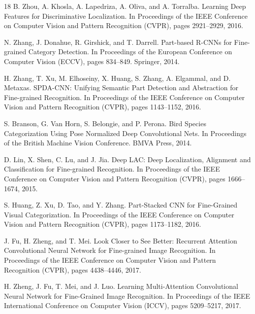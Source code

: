 \documentclass[conference]{IEEEtran}
\begin{document}
\begin{thebibliography}{18}
 B. Zhou, A. Khosla, A. Lapedriza, A. Oliva, and A. Torralba. Learning Deep Features for Discriminative Localization. In Proceedings of the IEEE Conference on Computer Vision and Pattern Recognition (CVPR), pages 2921–2929, 2016.

 N. Zhang, J. Donahue, R. Girshick, and T. Darrell. Part-based R-CNNs for Fine-grained Category Detection. In Proceedings of the European Conference on Computer Vision (ECCV), pages 834–849. Springer, 2014.

 H. Zhang, T. Xu, M. Elhoseiny, X. Huang, S. Zhang, A. Elgammal, and D. Metaxas. SPDA-CNN: Unifying Semantic Part Detection and Abstraction for Fine-grained Recognition. In Proceedings of the IEEE Conference on Computer Vision and Pattern Recognition (CVPR), pages 1143–1152, 2016.

 S. Branson, G. Van Horn, S. Belongie, and P. Perona. Bird Species Categorization Using Pose Normalized Deep Convolutional Nets. In Proceedings of the British Machine Vision Conference. BMVA Press, 2014.

 D. Lin, X. Shen, C. Lu, and J. Jia. Deep LAC: Deep Localization, Alignment and Classification for Fine-grained Recognition. In Proceedings of the IEEE Conference on Computer Vision and Pattern Recognition (CVPR), pages 1666–1674, 2015.

 S. Huang, Z. Xu, D. Tao, and Y. Zhang. Part-Stacked CNN for Fine-Grained Visual Categorization. In Proceedings of the IEEE Conference on Computer Vision and Pattern Recognition (CVPR), pages 1173–1182, 2016.

 J. Fu, H. Zheng, and T. Mei. Look Closer to See Better: Recurrent Attention Convolutional Neural Network for Fine-grained Image Recognition. In Proceedings of the IEEE Conference on Computer Vision and Pattern Recognition (CVPR), pages 4438–4446, 2017.

 H. Zheng, J. Fu, T. Mei, and J. Luo. Learning Multi-Attention Convolutional Neural Network for Fine-Grained Image Recognition. In Proceedings of the IEEE International Conference on Computer Vision (ICCV), pages 5209–5217, 2017.

\end{thebibliography}
\end{document}
